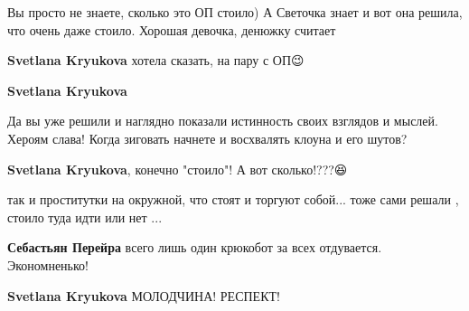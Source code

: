 \begin{itemize}
\begin{itemize}
Вы просто не знаете, сколько это ОП стоило) А Светочка знает и вот она решила, что очень даже стоило. Хорошая девочка, денюжку считает

 
\textbf{Svetlana Kryukova} хотела сказать, на пару с ОП😉

 
\textbf{Svetlana Kryukova} 

Да вы уже решили и наглядно показали истинность своих взглядов и мыслей. Хероям
слава! Когда зиговать начнете и восхвалять клоуна и его шутов?

 
\textbf{Svetlana Kryukova}, конечно "стоило"! А вот сколько!???😆

 
так и проститутки на окружной, что стоят и торгуют собой... тоже сами решали , стоило туда идти или нет ...

 
\textbf{Себастьян Перейра} всего лишь один крюкобот за всех отдувается. Экономненько!

 
\textbf{Svetlana Kryukova} МОЛОДЧИНА! РЕСПЕКТ!


\end{itemize}
\end{itemize}
